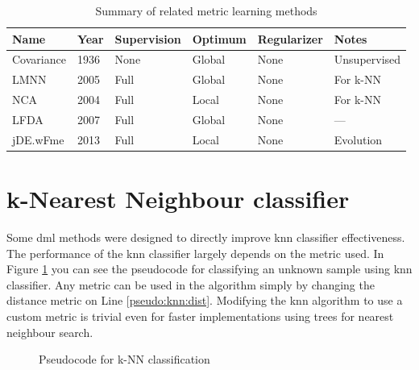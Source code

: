 \documentclass[12pt,a4paper]{report}
\begin{document}
\begin{table}[ht] \centering
\begin{tabular}{llllll}
\hline
Name & Year & Supervision & Optimum & Regularizer & Notes \\
\hline
Covariance & 1936 & None & Global & None & Unsupervised \\
LMNN & 2005 & Full & Global & None & For k-NN \\
NCA & 2004 & Full & Local & None & For k-NN \\
LFDA & 2007 & Full & Global & None & — \\
jDE.wFme & 2013 & Full & Local & None & Evolution \\
\hline
\end{tabular}
\caption{Summary of related metric learning methods} \label{tab:rw:summary}
\end{table}

\section{k-Nearest Neighbour classifier} \label{alg:knn}

Some \acl{dml} methods were designed to directly improve \acl{knn} classifier effectiveness. The performance of the \ac{knn} classifier largely depends on the metric used. In Figure \ref{pseudo:knn} you can see the pseudocode for classifying an unknown sample using \ac{knn} classifier. Any metric can be used in the algorithm simply by changing the distance metric on Line \ref{pseudo:knn:dist}. Modifying the \ac{knn} algorithm to use a custom metric is trivial even for faster implementations using trees for nearest neighbour search.

\begin{figure}
\begin{algorithm}[H]
\DontPrintSemicolon
\LinesNumbered
{}
\end{algorithm} 
\caption{Pseudocode for k-NN classification} \label{pseudo:knn}
\end{figure}
\end{document}
